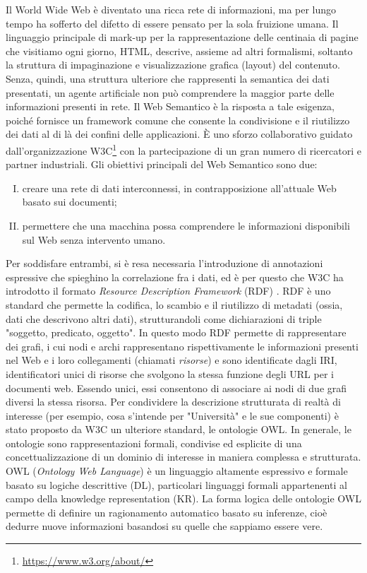 Il World Wide Web è diventato una ricca rete di informazioni, ma per lungo tempo ha sofferto del difetto di essere pensato per la sola fruizione umana. Il linguaggio principale di mark-up per la rappresentazione delle centinaia di pagine che visitiamo ogni giorno, HTML, descrive, assieme ad altri formalismi, soltanto la struttura di impaginazione e visualizzazione grafica (layout) del contenuto. Senza, quindi, una struttura ulteriore che rappresenti la semantica dei dati presentati, un agente artificiale non può comprendere la maggior parte delle informazioni presenti in rete. Il Web Semantico è la risposta a tale esigenza, poiché fornisce un framework comune che consente la condivisione e il riutilizzo dei dati al di là dei confini delle applicazioni. È uno sforzo collaborativo guidato dall'organizzazione W3C\footnote{\url{https://www.w3.org/about/}} con la partecipazione di un gran numero di ricercatori e partner industriali. Gli obiettivi principali del Web Semantico \cite{berners2001semantic, hitzler2021review} sono due:
\begin{enumerate}[I)]
	\item creare una rete di dati interconnessi, in contrapposizione all'attuale Web basato sui documenti;
	\item permettere che una macchina possa comprendere le informazioni disponibili sul Web senza intervento umano.
\end{enumerate}
Per soddisfare entrambi, si è resa necessaria l'introduzione di annotazioni espressive che spieghino la correlazione fra i dati, ed è per questo che W3C ha introdotto il formato \textit{Resource Description Framework} (RDF) \cite{RDFspecification}. RDF è uno standard che permette la codifica, lo scambio e il riutilizzo di metadati (ossia, dati che descrivono altri dati), strutturandoli come dichiarazioni di triple "soggetto, predicato, oggetto". In questo modo RDF permette di rappresentare dei grafi, i cui nodi e archi rappresentano rispettivamente le informazioni presenti nel Web e i loro collegamenti (chiamati \textit{risorse}) e sono identificate dagli IRI, identificatori unici di risorse che svolgono la stessa funzione degli URL per i documenti web. Essendo unici, essi consentono di associare ai nodi di due grafi diversi la stessa risorsa. Per condividere la descrizione strutturata di realtà di interesse (per esempio, cosa s'intende per "Università" e le sue componenti) è stato proposto da W3C un ulteriore standard, le ontologie OWL. In generale, le ontologie sono rappresentazioni formali, condivise ed esplicite di una concettualizzazione di un dominio di interesse \cite{goy2015ontologies} in maniera complessa e strutturata. OWL (\textit{Ontology Web Language}) è un linguaggio altamente espressivo e formale basato su logiche descrittive (DL), particolari linguaggi formali appartenenti  al campo della knowledge representation (KR). La forma logica delle ontologie OWL permette di definire un ragionamento automatico basato su inferenze, cioè dedurre nuove informazioni basandosi su quelle che sappiamo essere vere.


